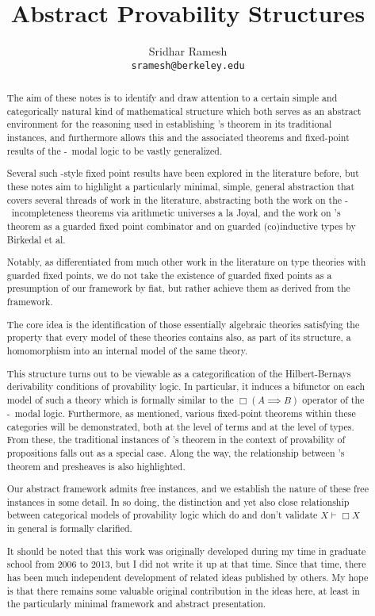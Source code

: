 \documentclass[12pt]{article}
\title{Abstract Provability Structures}
\author{
  Sridhar Ramesh\\
  \texttt{sramesh@berkeley.edu}
}
\begin{document}
\maketitle

\begin{abstract}
The aim of these notes is to identify and draw attention to a certain simple and categorically natural kind of mathematical structure which both serves as an abstract environment for the reasoning used in establishing \Loeb's theorem in its traditional instances, and furthermore allows this and the associated theorems and fixed-point results of the \Goedel-\Loeb\ modal logic to be vastly generalized.

Several such \Loeb-style fixed point results have been explored in the literature before, but these notes aim to highlight a particularly minimal, simple, general abstraction that covers several threads of work in the literature, abstracting both the work on the \Goedel-\Loeb\ incompleteness theorems via arithmetic universes a la Joyal, and the work on \Loeb's theorem as a guarded fixed point combinator and on guarded (co)inductive types by Birkedal et al.

Notably, as differentiated from much other work in the literature on type theories with guarded fixed points, we do not take the existence of guarded fixed points as a presumption of our framework by fiat, but rather achieve them as derived from the framework.

The core idea is the identification of those essentially algebraic theories satisfying the property that every model of these theories contains also, as part of its structure, a homomorphism into an internal model of the same theory.

This structure turns out to be viewable as a categorification of the Hilbert-Bernays derivability conditions of provability logic. In particular, it induces a bifunctor on each model of such a theory which is formally similar to the $\Box(A \implies B)$ operator of the \Goedel-\Loeb\ modal logic. Furthermore, as mentioned, various fixed-point theorems within these categories will be demonstrated, both at the level of terms and at the level of types. From these, the traditional instances of \Loeb's theorem in the context of provability of propositions falls out as a special case. Along the way, the relationship between \Loeb's theorem and presheaves is also highlighted.

Our abstract framework admits free instances, and we establish the nature of these free instances in some detail. In so doing, the distinction and yet also close relationship between categorical models of provability logic which do and don't validate $X \vdash \Box X$ in general is formally clarified.

It should be noted that this work was originally developed during my time in graduate school from 2006 to 2013, but I did not write it up at that time. Since that time, there has been much independent development of related ideas published by others. My hope is that there remains some valuable original contribution in the ideas here, at least in the particularly minimal framework and abstract presentation.
\end{abstract}
\end{document}
